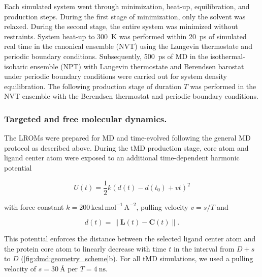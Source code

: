 Each simulated system went through minimization, heat-up, equilibration, and
production steps. During the first stage of minimization, only the solvent was
relaxed. During the second stage, the entire system was minimized without
restraints. System heat-up to \SI{300}{\kelvin} was performed within
\SI{20}{\pico\second} of simulated real time in the canonical ensemble (NVT)
using the Langevin thermostate and periodic boundary conditions. Subsequently,
\SI{500}{\pico\second} of MD in the isothermal-isobaric ensemble (NPT) with
Langevin thermostate and Berendsen barostat under periodic boundary conditions
were carried out for system density equilibration. The following production
stage of duration $T$ was performed in the NVT ensemble with the Berendsen
thermostat and periodic boundary conditions.


\subsubsection{Targeted and free molecular dynamics.}
The LROMs were prepared for MD and time-evolved following the general MD
protocol as described above. During the tMD production stage, core atom and
ligand center atom were exposed to an additional time-dependent harmonic
potential

\begin{equation}
U(t) = \frac{1}{2} k \left( d(t)-d(t_0) + vt   \right)^2
\end{equation}

with force constant $k=200\,\mathrm{kcal\,mol^{-1}\,A^{-2}}$, pulling velocity
$ v = s/T$ and

\begin{equation}
d(t) = \lVert \bm{L}(t)-\bm{C}(t) \rVert.
\end{equation}

This potential enforces the distance between the selected ligand center atom and
the protein core atom to linearly decrease with time $t$ in the interval from
$D+s$ to $D$ (\cref{fig:dmd:geometry_scheme}b). For all tMD simulations, we used
a pulling velocity of $s=\SI{30}{\angstrom}$ per $T=\SI{4}{\nano\second}$.

